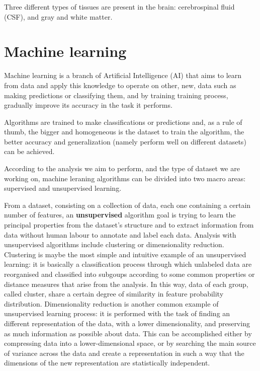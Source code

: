 \documentclass[11pt]{report}
\begin{document}
Three different types of tissues are present in the brain: cerebrospinal fluid (CSF), and gray and white matter.

\chapter{Machine learning}

Machine learning is a branch of Artificial Intelligence (AI) that aims to learn from data and apply this knowledge to operate on other, new, data such as making predictions or classifying them, and by training training process, gradually improve its accuracy in the task it performs.

Algorithms are trained to make classifications or predictions and, as a rule of thumb, the bigger and homogeneous is the dataset to train the algorithm, the better accuracy and generalization (namely perform well on different datasets) can be achieved.

According to the analysis we aim to perform, and the type of dataset we are working on, machine leraning algorithms can be divided into two macro areas: supervised and unsupervised learning.

From a dataset, consisting on a collection of data, each one containing a certain number of features, an \textbf{unsupervised} algorithm goal is trying to learn the principal properties from the dataset's structure and to extract information from data without human labour to annotate and label each data.
Analysis with unsupervised algorithms include clustering or dimensionality reduction.
Clustering is maybe the most simple and intuitive example of an unsupervised learning: it is basically a classification process through which unlabeled data are reorganised and classified into subgoups according to some common properties or distance measures that arise from the analysis.
In this way, data of each group, called cluster, share a certain degree of similarity in feature probability distribution.
Dimensionality reduction is another common example of unsupervised learning process: it is performed with the task of finding an different representation of the data, with a lower dimensionality, and preserving as much information as possible about data.
This can be accomplished either by compressing data into a lower-dimensional space, or by searching the main source of variance across the data and create a representation in such a way that the dimensions of the new representation are statistically independent.
\end{document}
